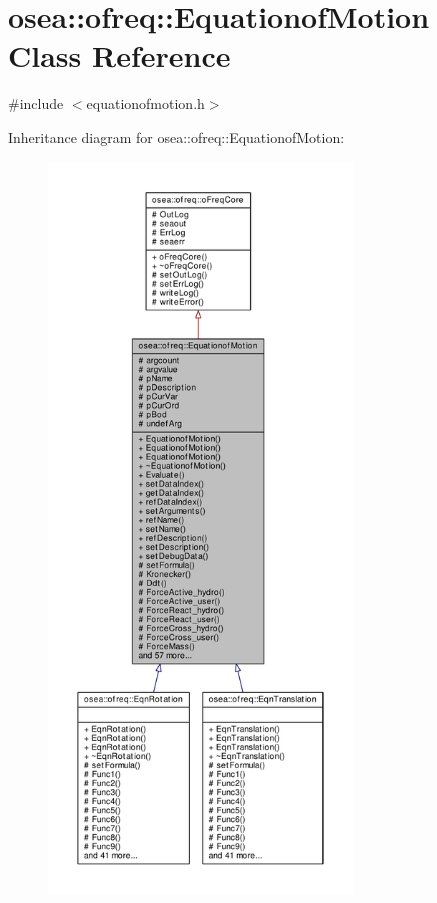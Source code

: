 \hypertarget{classosea_1_1ofreq_1_1_equationof_motion}{\section{osea\-:\-:ofreq\-:\-:Equationof\-Motion Class Reference}
\label{classosea_1_1ofreq_1_1_equationof_motion}
}


{\ttfamily \#include $<$equationofmotion.\-h$>$}



Inheritance diagram for osea\-:\-:ofreq\-:\-:Equationof\-Motion\-:\nopagebreak
\begin{figure}[H]
\begin{center}
\leavevmode
\includegraphics[height=550pt]{classosea_1_1ofreq_1_1_equationof_motion__inherit__graph}
\end{center}
\end{figure}
